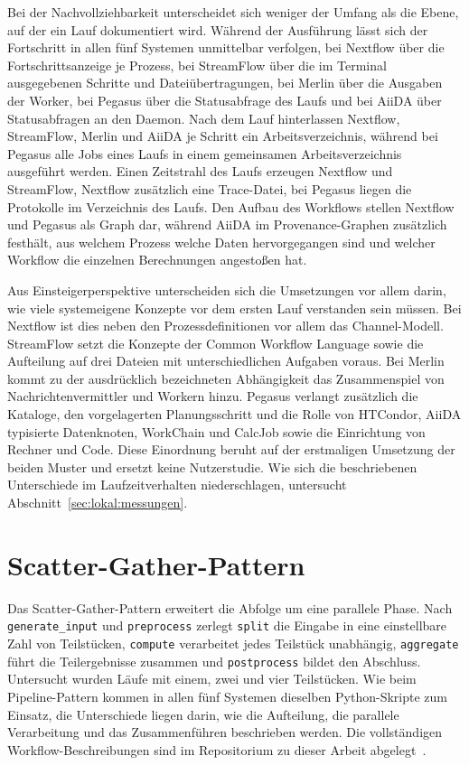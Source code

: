 Bei der Nachvollziehbarkeit unterscheidet sich weniger der Umfang
als die Ebene, auf der ein Lauf dokumentiert wird. Während der
Ausführung lässt sich der Fortschritt in allen fünf Systemen
unmittelbar verfolgen, bei Nextflow über die Fortschrittsanzeige je
Prozess, bei StreamFlow über die im Terminal ausgegebenen Schritte
und Dateiübertragungen, bei Merlin über die Ausgaben der Worker, bei
Pegasus über die Statusabfrage des Laufs und bei AiiDA über
Statusabfragen an den Daemon. Nach dem Lauf hinterlassen Nextflow,
StreamFlow, Merlin und AiiDA je Schritt ein Arbeitsverzeichnis,
während bei Pegasus alle Jobs eines Laufs in einem gemeinsamen
Arbeitsverzeichnis ausgeführt werden. Einen Zeitstrahl des Laufs
erzeugen Nextflow und StreamFlow, Nextflow zusätzlich eine
Trace-Datei, bei Pegasus liegen die Protokolle im Verzeichnis des
Laufs. Den Aufbau des Workflows stellen Nextflow und Pegasus als
Graph dar, während AiiDA im Provenance-Graphen zusätzlich festhält,
aus welchem Prozess welche Daten hervorgegangen sind und welcher
Workflow die einzelnen Berechnungen angestoßen hat.

Aus Einsteigerperspektive unterscheiden sich die Umsetzungen vor
allem darin, wie viele systemeigene Konzepte vor dem ersten Lauf
verstanden sein müssen. Bei Nextflow ist dies neben den
Prozessdefinitionen vor allem das Channel-Modell. StreamFlow setzt
die Konzepte der Common Workflow Language sowie die Aufteilung auf
drei Dateien mit unterschiedlichen Aufgaben voraus. Bei Merlin kommt
zu der ausdrücklich bezeichneten Abhängigkeit das Zusammenspiel von
Nachrichtenvermittler und Workern hinzu. Pegasus verlangt zusätzlich
die Kataloge, den vorgelagerten Planungsschritt und die Rolle von
HTCondor, AiiDA typisierte Datenknoten, WorkChain und CalcJob sowie
die Einrichtung von Rechner und Code. Diese Einordnung beruht auf der
erstmaligen Umsetzung der beiden Muster und ersetzt keine
Nutzerstudie. Wie sich die beschriebenen Unterschiede im
Laufzeitverhalten niederschlagen, untersucht
Abschnitt~\ref{sec:lokal:messungen}.

\section{Scatter-Gather-Pattern}
\label{sec:lokal:scattergather}

Das Scatter-Gather-Pattern erweitert die Abfolge um eine parallele
Phase. Nach \texttt{generate\_input} und \texttt{preprocess} zerlegt
\texttt{split} die Eingabe in eine einstellbare Zahl von Teilstücken,
\texttt{compute} verarbeitet jedes Teilstück unabhängig,
\texttt{aggregate} führt die Teilergebnisse zusammen und
\texttt{postprocess} bildet den Abschluss. Untersucht wurden Läufe mit
einem, zwei und vier Teilstücken. Wie beim Pipeline-Pattern kommen in
allen fünf Systemen dieselben Python-Skripte zum Einsatz, die
Unterschiede liegen darin, wie die Aufteilung, die parallele
Verarbeitung und das Zusammenführen beschrieben werden. Die vollständigen Workflow-Beschreibungen sind im Repositorium zu
dieser Arbeit abgelegt~\cite{barepo}.


